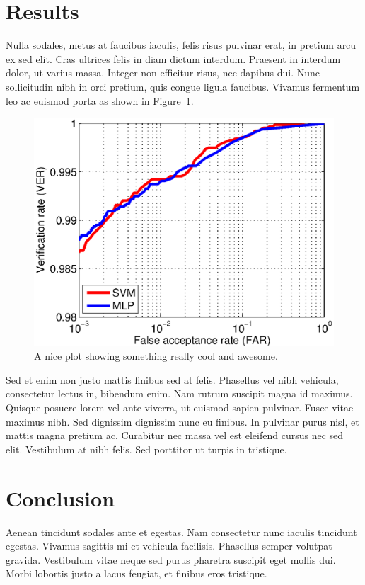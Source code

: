 \documentclass[9pt]{IEEEtran}
\begin{document}
\section{Results}
Nulla sodales, metus at faucibus iaculis, felis risus pulvinar erat, in pretium arcu ex sed elit. Cras ultrices felis in diam dictum interdum. Praesent in interdum dolor, ut varius massa. Integer non efficitur risus, nec dapibus dui. Nunc sollicitudin nibh in orci pretium, quis congue ligula faucibus. Vivamus fermentum leo ac euismod porta as shown in Figure~\ref{fig:plot1}.

\begin{figure}[h]
    \centering
    \includegraphics[width=1\columnwidth]{plot1}
    \caption{A nice plot showing something really cool and awesome.}
    \label{fig:plot1}
\end{figure}
 
Sed et enim non justo mattis finibus sed at felis. Phasellus vel nibh vehicula, consectetur lectus in, bibendum enim. Nam rutrum suscipit magna id maximus. Quisque posuere lorem vel ante viverra, ut euismod sapien pulvinar. Fusce vitae maximus nibh. Sed dignissim dignissim nunc eu finibus. In pulvinar purus nisl, et mattis magna pretium ac. Curabitur nec massa vel est eleifend cursus nec sed elit. Vestibulum at nibh felis. Sed porttitor ut turpis in tristique.

 \section{Conclusion}

Aenean tincidunt sodales ante et egestas. Nam consectetur nunc iaculis tincidunt egestas. Vivamus sagittis mi et vehicula facilisis. Phasellus semper volutpat gravida. Vestibulum vitae neque sed purus pharetra suscipit eget mollis dui. Morbi lobortis justo a lacus feugiat, et finibus eros tristique.



\end{document}
